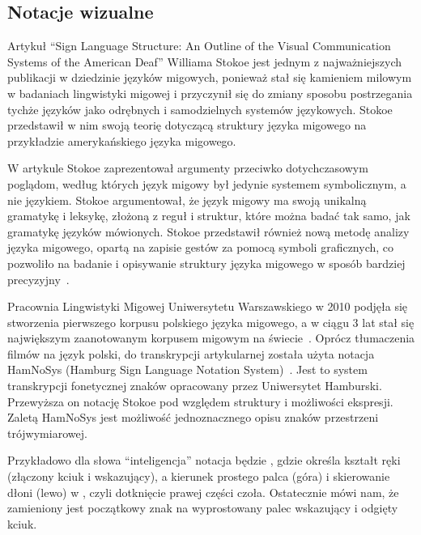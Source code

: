 \subsection{Notacje wizualne}
\label{subsec:visual-notation}

Artykuł \enquote{Sign Language Structure: An Outline of the Visual Communication Systems of the American Deaf} Williama Stokoe jest jednym z najważniejszych publikacji w dziedzinie języków migowych, ponieważ stał się kamieniem milowym w badaniach lingwistyki migowej i przyczynił się do zmiany sposobu postrzegania tychże języków jako odrębnych i samodzielnych systemów językowych. Stokoe przedstawił w nim swoją teorię dotyczącą struktury języka migowego na przykładzie amerykańskiego języka migowego.

W artykule Stokoe zaprezentował argumenty przeciwko dotychczasowym poglądom, według których język migowy był jedynie systemem symbolicznym, a nie językiem. Stokoe argumentował, że język migowy ma swoją unikalną gramatykę i leksykę, złożoną z reguł i struktur, które można badać tak samo, jak gramatykę języków mówionych. Stokoe przedstawił również nową metodę analizy języka migowego, opartą na zapisie gestów za pomocą symboli graficznych, co pozwoliło na badanie i opisywanie struktury języka migowego w sposób bardziej precyzyjny~\cite{stokoe2005}.

Pracownia Lingwistyki Migowej Uniwersytetu Warszawskiego w 2010 podjęła się stworzenia pierwszego korpusu polskiego języka migowego, a w ciągu 3 lat stał się największym zaanotowanym korpusem migowym na świecie~\cite{rutkowski2013}. Oprócz tłumaczenia filmów na język polski, do transkrypcji artykularnej została użyta notacja HamNoSys (Hamburg Sign Language Notation System)~\cite{hanke2004}. Jest to system transkrypcji fonetycznej znaków opracowany przez Uniwersytet Hamburski. Przewyższa on notację Stokoe pod względem struktury i możliwości ekspresji. Zaletą HamNoSys jest możliwość jednoznacznego opisu znaków przestrzeni trójwymiarowej.

Przykładowo dla słowa \enquote{inteligencja} notacja będzie \hampinchonetwo\hamextfingeru\hampalml\hamforehead\hamlrat\hamtouch\hamreplace\hamfingertwo\hamthumbopenmod, gdzie \hampinchonetwo\hamspace określa kształt ręki (złączony kciuk i wskazujący), a \hamextfingeru\hamspace kierunek prostego palca (góra) i \hampalml\hamspace skierowanie dłoni (lewo) w \hamforehead\hamlrat\hamtouch, czyli dotknięcie prawej części czoła. Ostatecznie \hamreplace\hamfingertwo\hamthumbopenmod\hamspace mówi nam, że zamieniony jest początkowy znak na wyprostowany palec wskazujący i odgięty kciuk.


